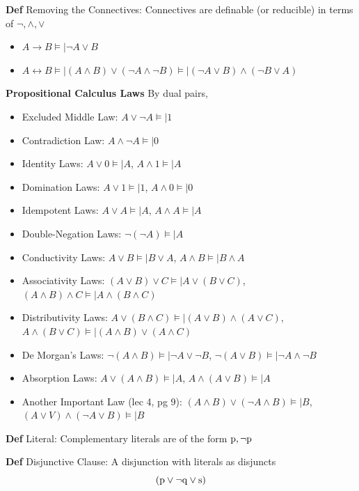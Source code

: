 \documentclass[11pt,notitlepage]{report}
\newcommand{\tbf}[1]{\textbf{#1}}
\newcommand{\modelsm}{\mathrel{\models\!\rvert}}
\begin{document}
\textbf{Def} Removing the Connectives: Connectives are definable (or reducible) in terms of $\neg, \wedge, \vee$
\vspace{-2mm}
\begin{itemize}
    \item $A \to B \modelsm \neg A \vee B$
    \item $A \leftrightarrow B \modelsm (A \wedge B) \vee (\neg A \wedge \neg B) \modelsm (\neg A \vee B) \wedge (\neg B \vee A)$
\end{itemize}

\newpage
\tbf{Propositional Calculus Laws} By dual pairs,
\begin{itemize}
    \item Excluded Middle Law: $A \vee \neg A \modelsm 1$
    \item Contradiction Law: $A \wedge \neg A \modelsm 0$
    \item Identity Laws: $A \vee 0 \modelsm A$, $A \wedge 1 \modelsm A$
    \item Domination Laws: $A \vee 1 \modelsm 1$, $A \wedge 0 \modelsm 0$
    \item Idempotent Laws: $A \vee A \modelsm A$, $A \wedge A \modelsm A$
    \item Double-Negation Laws: $\neg (\neg A)\modelsm A$
    \item Conductivity Laws: $A \vee B \modelsm B \vee A$, $A \wedge B \modelsm B \wedge A$
    \item Associativity Laws: $(A \vee B) \vee C \modelsm A \vee (B \vee C)$, $(A \wedge B) \wedge C \modelsm A \wedge (B \wedge C)$
    \item Distributivity Laws: $A \vee (B \wedge C) \modelsm (A \vee B) \wedge (A \vee C)$, $A \wedge (B \vee C) \modelsm (A \wedge B) \vee (A \wedge C)$
    \item De Morgan's Laws: $\neg(A \wedge B) \modelsm \neg A \vee \neg B$, $\neg(A \vee B) \modelsm \neg A \wedge \neg B$
    \item Absorption Laws: $A \vee (A \wedge B) \modelsm A$, $A \wedge (A \vee B) \modelsm A$
    \item Another Important Law (lec 4, pg 9): $(A \wedge B) \vee (\neg A \wedge B) \modelsm B$, $(A \vee V) \wedge (\neg A \vee B) \modelsm B$
\end{itemize}

\textbf{Def} Literal: Complementary literals are of the form $\rm p, \neg \rm p$ 

\textbf{Def} Disjunctive Clause: A disjunction with literals as disjuncts 
$$(\rm p \vee \neg \rm q \vee \rm s)$$
\end{document}
